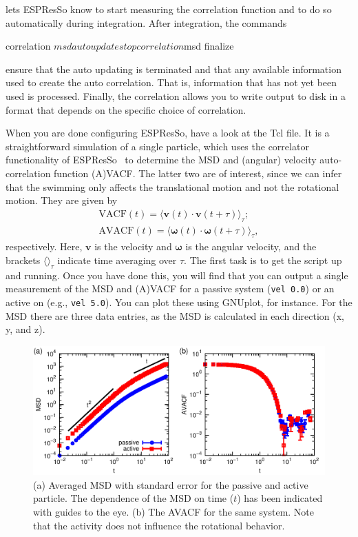 \documentclass[aip,jcp,reprint,a4paper,onecolumn,amsmath]{revtex4-1}
\newcommand{\es}{\mbox{\textsf{ESPResSo}}\xspace}
\newcommand\codees{\lstinline[language=espresso]}
\begin{document}
lets \es{} know to start measuring the correlation function and to do so automatically during integration. After integration, the commands
\begin{espresso}
correlation $msd autoupdate stop
correlation $msd finalize
\end{espresso}
ensure that the auto updating is terminated and that any available information used to create the auto correlation. That is, information that has not yet been used is processed. Finally, the correlation allows you to write output to disk in a format that depends on the specific choice of correlation.

When you are done configuring \es{}, have a look at the Tcl file. It is a straightforward simulation of a single particle, which uses the correlator functionality of \es{}~\cite{Arnold_13,UG} to determine the MSD and (angular) velocity auto-correlation function (A)VACF. The latter two are of interest, since we can infer that the swimming only affects the translational motion and not the rotational motion. They are given by
\begin{eqnarray}
\label{eq:vacf} \mathrm{VACF}(t) = \langle \mathbf{v}(t) \cdot \mathbf{v}(t + \tau) \rangle_{\tau}; \\
\label{eq:avacf} \mathrm{AVACF}(t) = \langle \boldsymbol{\omega}(t) \cdot \boldsymbol{\omega}(t + \tau) \rangle_{\tau} ,
\end{eqnarray}
respectively. Here, $$ is the velocity and $\boldsymbol{\omega}$ is the angular velocity, and the brackets $\langle \rangle_{\tau}$ indicate time averaging over $\tau$. The first task is to get the script up and running. Once you have done this, you will find that you can output a single measurement of the MSD and (A)VACF for a passive system (\codees{vel 0.0}) or an active on (e.g., \codees{vel 5.0}). You can plot these using GNUplot, for instance. For the MSD there are three data entries, as the MSD is calculated in each direction (x, y, and z). 

\begin{figure}[!htb]
\begin{center}
\includegraphics[scale=0.75]{FIGURES/enhanced}
\end{center}
\caption{\label{fig:enhanced}(a) Averaged MSD with standard error for the passive and active particle. The dependence of the MSD on time ($t$) has been indicated with guides to the eye. (b) The AVACF for the same system. Note that the activity does not influence the rotational behavior.}
\end{figure}
\end{document}
